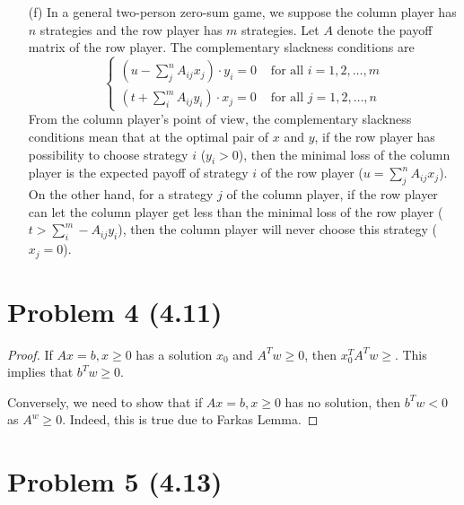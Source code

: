 \documentclass[12pt]{article}
\begin{document}
\begin{itemize}
	\item[(f)] In a general two-person zero-sum game, we suppose the column player has $n$ strategies and the row player has $m$ strategies. Let $A$ denote the payoff matrix of the row player. The complementary slackness conditions are
	\[\begin{cases}
	(u - \sum_{j}^{n} A_{ij}x_{j})\cdot y_i = 0 & \text{ for all } i=1,2,\ldots,m\\
	(t + \sum_{i}^{m} A_{ij}y_{i})\cdot x_j = 0 & \text{ for all } j=1,2,\ldots,n
	\end{cases}\]
	From the column player's point of view, the complementary slackness conditions mean that at the optimal pair of $x$ and $y$, if the row player has possibility to choose strategy $i$ ($y_i>0$), then the minimal loss of the column player is the expected payoff of strategy $i$ of
	the row player ($u = \sum_{j}^{n} A_{ij}x_{j}$). On the other hand, for a strategy $j$ of the column player, if the row player can let the column player get less than the minimal loss of the row player ($t > \sum_{i}^{m} -A_{ij}y_{i}$), then the column player will never choose this strategy ($x_j=0$).
\end{itemize}



\section*{Problem 4 (4.11)}


\begin{proof}

If $Ax = b, x\geqslant 0$ has a solution $x_0$ and $A^Tw \geqslant 0$, then $x_0^TA^Tw \geqslant$. This implies that $b^Tw\geqslant 0$.

Conversely, we need to show that if $Ax = b, x\geqslant 0$ has no solution, then $b^Tw <0$ as $A^w \geqslant 0$. Indeed, this is true due to Farkas Lemma.

\end{proof}

\section*{Problem 5 (4.13)}
\end{document}
